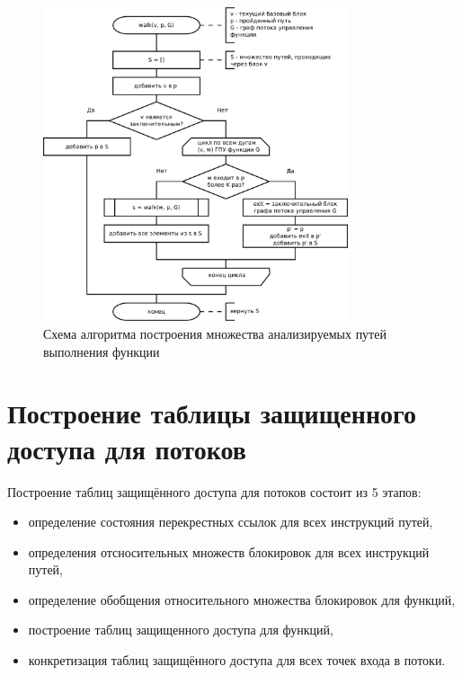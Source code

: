 \begin{figure}
  \centering
  \includegraphics[width=0.8\textwidth]{inc/dia/build-pathes}
  \caption{Схема алгоритма построения множества анализируемых путей выполнения функции}
  \label{fig:build-pathes}
\end{figure}
 
\section{Построение таблицы защищенного доступа для потоков}

Построение таблиц защищённого доступа для потоков состоит из 5 этапов:

\begin{itemize}
  \item определение состояния перекрестных ссылок для всех инструкций путей,
  \item определения отсносительных множеств блокировок для всех инструкций путей,
  \item определение обобщения относительного множества блокировок для функций,
  \item построение таблиц защищенного доступа для функций,
  \item конкретизация таблиц защищённого доступа для всех точек входа в потоки.
\end{itemize}

